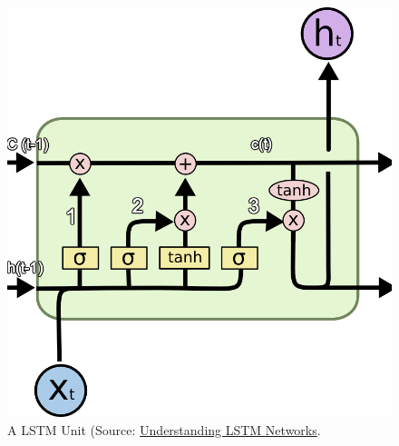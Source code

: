\documentclass[twoside,11pt]{article}
\begin{document}
\begin{figure}
    \centering
    \includegraphics[scale=0.3]{img/lstm.png}
    \caption{A LSTM Unit (Source: \href{http://colah.github.io/posts/2015-08-Understanding-LSTMs}{Understanding LSTM Networks}.}
    \label{fig:lstm}
\end{figure}
\end{document}
